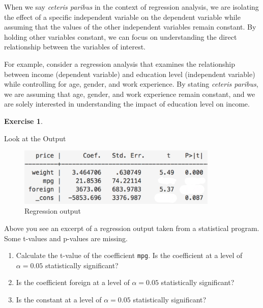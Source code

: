 \documentclass[
  12pt,
  oneside]{book}
\providecommand{\tightlist}{%
  \setlength{\itemsep}{0pt}\setlength{\parskip}{0pt}}
\theoremstyle{definition}
\theoremstyle{definition}
\theoremstyle{definition}
\newtheorem{exercise}{Exercise}[chapter]
\theoremstyle{definition}
\theoremstyle{remark}
\begin{document}
When we say \emph{ceteris paribus} in the context of regression analysis, we are isolating the effect of a specific independent variable on the dependent variable while assuming that the values of the other independent variables remain constant. By holding other variables constant, we can focus on understanding the direct relationship between the variables of interest.

For example, consider a regression analysis that examines the relationship between income (dependent variable) and education level (independent variable) while controlling for age, gender, and work experience. By stating \emph{ceteris paribus}, we are assuming that age, gender, and work experience remain constant, and we are solely interested in understanding the impact of education level on income.

\begin{exercise}
\protect\hypertarget{exr:lookatoutput}{}\label{exr:lookatoutput}

Look at the Output

\begin{figure}
\centering
\includegraphics[width=0.85\textwidth,height=\textheight]{fig/reg_stata2.png}
\caption{\label{fig:regstata2} Regression output}
\end{figure}

Above you see an excerpt of a regression output taken from a statistical program. Some t-values and p-values are missing.

\begin{enumerate}
\def\labelenumi{\alph{enumi})}
\tightlist
\item
  Calculate the t-value of the coefficient \texttt{mpg}. Is the coefficient at a level of \(\alpha=0.05\) statistically significant?\\
\item
  Is the coefficient foreign at a level of \(\alpha=0.05\) statistically significant?\\
\item
  Is the constant at a level of \(\alpha=0.05\) statistically significant?
\end{enumerate}

\end{exercise}
\end{document}
